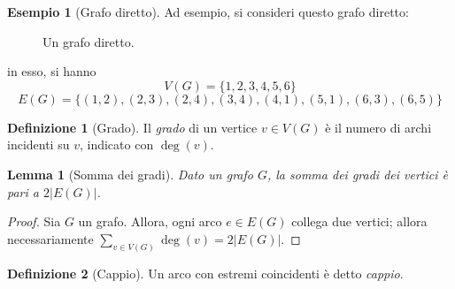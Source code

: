 \documentclass[14pt]{extreport}
\newtheorem{lemma}{Lemma}[subsection]
\theoremstyle{definition}
\newtheorem{definition}{Definizione}[subsection]
\theoremstyle{definition}
\newtheorem{example}{Esempio}[subsection]
\begin{document}
\begin{example}[Grafo diretto]
    Ad esempio, si consideri questo grafo diretto:

    \begin{figure}[H]
        \centering
        \caption{Un grafo diretto.}
    \end{figure}

    in esso, si hanno $$V(G) = \{1, 2, 3, 4, 5, 6\}$$ $$E(G) = \{(1, 2), (2, 3), (2, 4), (3, 4), (4, 1), (5, 1), (6, 3), (6, 5)\}$$
\end{example}

\begin{definition}[Grado]
    Il \textit{grado} di un vertice $v \in V(G)$ è il numero di archi incidenti su $v$, indicato con $\deg(v)$.
\end{definition}

\begin{lemma}[Somma dei gradi]
    \label{Somma dei gradi}
    Dato un grafo $G$, la somma dei gradi dei vertici è pari a $2 |E(G)|$.
\end{lemma}

\begin{proof}
    Sia $G$ un grafo. Allora, ogni arco $e \in E(G)$ collega due vertici; allora necessariamente $\displaystyle \sum_{v \in V(G)}{\deg(v)} = 2 |E(G)|$.
\end{proof}

\begin{definition}[Cappio]
    Un arco con estremi coincidenti è detto \textit{cappio}.
\end{definition}
\end{document}
